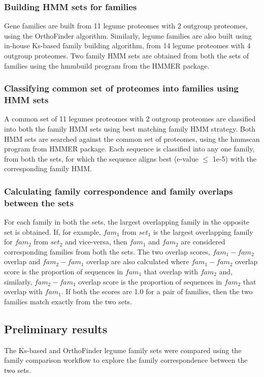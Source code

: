 \documentclass{article}
\begin{document}
			\subsubsection{Building HMM sets for families}
			Gene families are built from 11 legume proteomes with 2 outgroup proteomes, using the OrthoFinder algorithm. Similarly, legume families are also built using in-house Ks-based family building algorithm, from 14 legume proteomes with 4 outgroup proteomes. Two family HMM sets are obtained from both the sets of families using the hmmbuild program from the HMMER package.
			
			\subsubsection{Classifying common set of proteomes into families using HMM sets}
			A common set of 11 legumes proteomes with 2 outgroup proteomes are classified into both the family HMM sets using best matching family HMM strategy. Both HMM sets are searched against the common set of proteomes, using the hmmscan program from HMMER package. Each sequence is classified into any one family, from both the sets, for which the sequence aligns best (e-value $\leq$ 1e-5) with the corresponding family HMM.
			
			\subsubsection{Calculating family correspondence and family overlaps between the sets}
			For each family in both the sets, the largest overlapping family in the opposite set  is obtained. If, for example, $fam_1$ from $set_1$ is the largest overlapping family for $fam_2$ from $set_2$ and vice-versa, then $fam_1$ and $fam_2$ are considered corresponding families from both the sets. The two overlap scores, $fam_1-fam_2$ overlap and $fam_2-fam_1$ overlap are also calculated where $fam_1-fam_2$ overlap score is the proportion of sequences in $fam_1$ that overlap with $fam_2$ and, similarly, $fam_2-fam_1$ overlap score is the proportion of sequences in $fam_2$ that overlap with $fam_1$. If both the scores are 1.0 for a pair of families, then the two families match exactly from the two sets.
			
		\subsection{Preliminary results}
		The Ks-based and OrthoFinder legume family sets were compared using the family comparison workflow to explore the family correspondence between the two sets.
		
\end{document}
